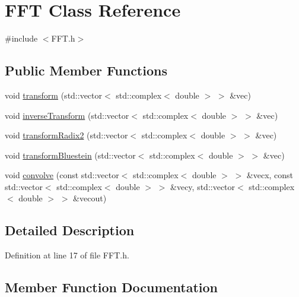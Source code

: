 \hypertarget{class_f_f_t}{}\section{F\+FT Class Reference}
\label{class_f_f_t}


{\ttfamily \#include $<$F\+F\+T.\+h$>$}

\subsection*{Public Member Functions}
\begin{DoxyCompactItemize}
\item 
void \mbox{\hyperlink{class_f_f_t_acb77aec27c2395b07f4649422341b4aa}{transform}} (std\+::vector$<$ std\+::complex$<$ double $>$ $>$ \&vec)
\item 
void \mbox{\hyperlink{class_f_f_t_af95adcd45866ac6a6645da56f99b7578}{inverse\+Transform}} (std\+::vector$<$ std\+::complex$<$ double $>$ $>$ \&vec)
\item 
void \mbox{\hyperlink{class_f_f_t_ae6d16a7fd911180ae2f4f1a3c08f7819}{transform\+Radix2}} (std\+::vector$<$ std\+::complex$<$ double $>$ $>$ \&vec)
\item 
void \mbox{\hyperlink{class_f_f_t_a2f45c15b3053ec0cc8ebc33bcd6da935}{transform\+Bluestein}} (std\+::vector$<$ std\+::complex$<$ double $>$ $>$ \&vec)
\item 
void \mbox{\hyperlink{class_f_f_t_a19baf6312ad6da440464f9831c4f2342}{convolve}} (const std\+::vector$<$ std\+::complex$<$ double $>$ $>$ \&vecx, const std\+::vector$<$ std\+::complex$<$ double $>$ $>$ \&vecy, std\+::vector$<$ std\+::complex$<$ double $>$ $>$ \&vecout)
\end{DoxyCompactItemize}


\subsection{Detailed Description}


Definition at line 17 of file F\+F\+T.\+h.



\subsection{Member Function Documentation}
\mbox{\label{class_f_f_t_a19baf6312ad6da440464f9831c4f2342}} 
